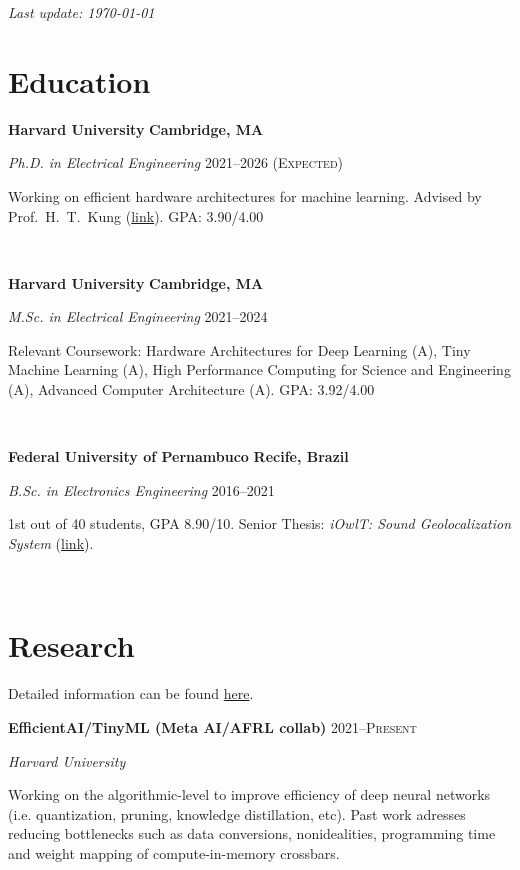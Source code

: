 \documentclass[letterpaper,10pt]{article}
\newcommand{\entry}[4]{

\begin{minipage}[t]{.15\textwidth}
\end{minipage}
\hfill\vline\hfill 
\begin{minipage}[t]{0.95\textwidth}
#2 \hfill \textsc{#1}

\textit{#3}

\footnotesize{#4}
\end{minipage}\\\vspace{.25cm}}
\newcommand{\we}[5]{

\begin{minipage}[t]{.15\textwidth}
\end{minipage}
\hfill\vline\hfill 
\begin{minipage}[t]{0.95\textwidth}
#2 \hfill \textbf{#5}

\textit{#3} \hfill \textsc{#1}

\footnotesize{#4}
\end{minipage}\\\vspace{.25cm}}
\newcommand{\harv}{Harvard University}
\newcommand{\ufpe}{Federal University of Pernambuco}
\begin{document}
\par{\par}
\par{\par}
\par{\par}
\hfill \textit{Last update: \today}
\vspace{-.25cm}

\section{Education}
\vspace*{.1cm}
\we{2021--2026 (Expected)}{\textbf{\harv}}{Ph.D. in Electrical Engineering}{Working on efficient hardware architectures for machine learning. Advised by Prof.\ H.\ T.\ Kung (\href{https://www.eecs.harvard.edu/htk/}{link}). GPA: 3.90/4.00}{Cambridge, MA}

\we{2021--2024}{\textbf{\harv}}{M.Sc. in Electrical Engineering}{Relevant Coursework: Hardware Architectures for Deep Learning (A), Tiny Machine Learning (A), High Performance Computing for Science and Engineering (A), Advanced Computer Architecture (A). GPA: 3.92/4.00}{Cambridge, MA}

\we{2016--2021}{\textbf{\ufpe}}{B.Sc. in Electronics Engineering}{
	1st out of 40 students, GPA 8.90/10. Senior Thesis: \textit{iOwlT: Sound Geolocalization System} (\href{https://www.matheussfarias.com/assets/files/SeniorThesis.pdf}{link}).
	}{Recife, Brazil}

\vspace*{-.25cm}
\section{Research}

Detailed information can be found \href{https://www.matheussfarias.com/}{here}.

\vspace{.1cm}

\entry{2021--Present}{\textbf{EfficientAI/TinyML (Meta AI/AFRL collab)}}{\harv}{
	Working on the algorithmic-level to improve efficiency of deep neural networks (i.e. quantization, pruning, knowledge distillation, etc). Past work adresses reducing bottlenecks such as data conversions, nonidealities, programming time and weight mapping of compute-in-memory crossbars.
}
\end{document}
